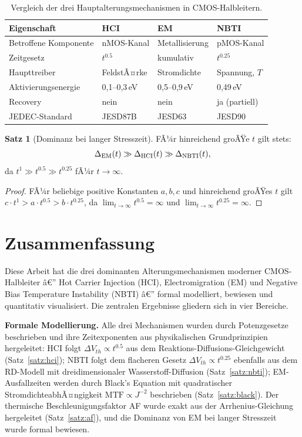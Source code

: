 ﻿\documentclass[a4paper,12pt]{article}
\theoremstyle{definition}
\newtheorem{satz}{Satz}
\begin{document}
\begin{table}[htbp]
	\centering
	\caption{Vergleich der drei Hauptalterungsmechanismen in CMOS-Halbleitern.}
	\label{tab:vergleich}
	\begin{tabular}{@{}llll@{}}
		\toprule
		Eigenschaft & HCI & EM & NBTI \\
		\midrule
		Betroffene Komponente & nMOS-Kanal & Metallisierung & pMOS-Kanal \\
		Zeitgesetz & $t^{0.5}$ & kumulativ & $t^{0.25}$ \\
		Haupttreiber & FeldstÃ¤rke & Stromdichte & Spannung, $T$ \\
		Aktivierungsenergie & 0{,}1--0{,}3\,eV & 0{,}5--0{,}9\,eV & 0{,}49\,eV \\
		Recovery & nein & nein & ja (partiell) \\
		JEDEC-Standard & JESD87B & JESD63 & JESD90 \\
		\bottomrule
	\end{tabular}
\end{table}

\begin{satz}[Dominanz bei langer Stresszeit]
	FÃ¼r hinreichend groÃŸe $t$ gilt stets:
	\[
	\Delta_{\rm EM}(t) \gg \Delta_{\rm HCI}(t) \gg \Delta_{\rm NBTI}(t),
	\]
	da $t^1 \gg t^{0.5} \gg t^{0.25}$ fÃ¼r $t \to \infty$.
\end{satz}

\begin{proof}
	FÃ¼r beliebige positive Konstanten $a, b, c$ und hinreichend groÃŸes $t$ gilt
	$c \cdot t^1 > a \cdot t^{0.5} > b \cdot t^{0.25}$, da
	$\lim_{t\to\infty} t^{0.5} = \infty$ und
	$\lim_{t\to\infty} t^{0.25} = \infty$.
	\qedhere
\end{proof}

\section{Zusammenfassung}

Diese Arbeit hat die drei dominanten Alterungsmechanismen moderner CMOS-Halbleiter
â€” Hot Carrier Injection (HCI), Electromigration (EM) und Negative Bias Temperature
Instability (NBTI) â€” formal modelliert, bewiesen und quantitativ visualisiert.
Die zentralen Ergebnisse gliedern sich in vier Bereiche.

\textbf{Formale Modellierung.}
Alle drei Mechanismen wurden durch Potenzgesetze beschrieben und ihre Zeitexponenten
aus physikalischen Grundprinzipien hergeleitet:
HCI folgt $\Delta V_{th} \propto t^{0.5}$ aus dem Reaktions-Diffusions-Gleichgewicht
(Satz~\ref{satz:hci}); NBTI folgt dem flacheren Gesetz
$\Delta V_{th} \propto t^{0.25}$ ebenfalls aus dem RD-Modell mit dreidimensionaler
Wasserstoff-Diffusion (Satz~\ref{satz:nbti}); EM-Ausfallzeiten werden durch
Black's Equation mit quadratischer StromdichteabhÃ¤ngigkeit $\mathrm{MTF} \propto J^{-2}$
beschrieben (Satz~\ref{satz:black}). Der thermische Beschleunigungsfaktor AF wurde
exakt aus der Arrhenius-Gleichung hergeleitet (Satz~\ref{satz:af}), und die Dominanz
von EM bei langer Stresszeit wurde formal bewiesen.
\end{document}
